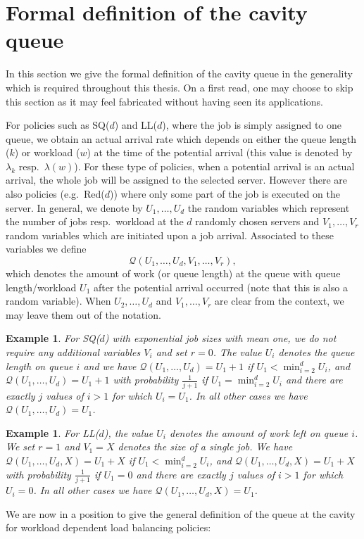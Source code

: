 \documentclass[12pt]{report}
\newtheorem{vbd}[theorem]{Example}
\begin{document}
\section{Formal definition of the cavity queue}
In this section we give the formal definition of the cavity queue in the generality which is required throughout this thesis. On a first read, one may choose to skip this section as it may feel fabricated without having seen its applications.

For policies such as SQ($d$) and LL($d$), where the job is simply assigned to one queue, we obtain an actual arrival rate which depends on either the queue length ($k$) or workload ($w$) at the time of the potential arrival (this value is denoted by $\lambda_k$ resp.~$\lambda(w)$). For these type of policies, when a potential arrival is an actual arrival, the whole job will be assigned to the selected server. However there are also policies (e.g.~Red($d$)) where only some part of the job is executed on the server. In general, we denote by $U_1,\dots,U_d$ the random variables which represent the number of jobs resp.~workload at the $d$ randomly chosen servers and $V_1,\dots,V_r$ random variables which are initiated upon a job arrival. Associated to these variables we define
$$
\mathcal{Q}(U_1,\dots,U_d,V_1,\dots,V_r),
$$
which denotes the amount of work (or queue length) at the queue with queue length/workload $U_1$ after the potential arrival occurred (note that this is also a random variable). 
When $U_2,\dots, U_d$ and $V_1,\dots,V_r$ are clear from the context, we may leave them out of the notation.

\begin{vbd}\label{example:SQdQ}
	For SQ($d$) with exponential job sizes with mean one, we do not require any additional variables $V_i$ and set $r=0$. The value $U_i$ denotes the queue length on queue $i$ and we have $\mathcal{Q}(U_1,\dots,U_d)=U_1+1$ if $U_1 < \min_{i=2}^d U_i$, and $\mathcal{Q}(U_1,\dots,U_d)=U_1+1$ with probability $\frac{1}{j+1}$ if $U_1=\min_{i=2}^d U_i$ and there are exactly $j$ values of $i>1$ for which $U_i=U_1$. In all other cases we have $\mathcal{Q}(U_1,\dots,U_d)=U_1$.
\end{vbd}

\begin{vbd}\label{example:LLdQ}
	For LL($d$), the value $U_i$ denotes the amount of work left on queue $i$. We set $r=1$ and $V_1 = X$ denotes the size of a single job. We have $\mathcal{Q}(U_1,\dots,U_d,X)=U_1+X$ if $U_1 < \min_{i=2}^d U_i$, and $\mathcal{Q}(U_1,\dots,U_d,X)=U_1+X$ with probability $\frac{1}{j+1}$ if $U_1=0$ and there are exactly $j$ values of $i>1$ for which $U_i=0$. In all other cases we have $\mathcal{Q}(U_1,\dots,U_d,X)=U_1$.
\end{vbd}
We are now in a position to give the general definition of the queue at the cavity for workload dependent load balancing policies:
\end{document}
